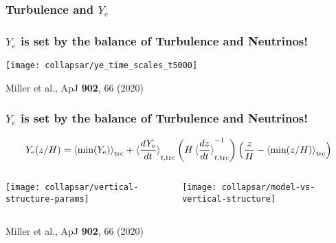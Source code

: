 \documentclass[]{beamer}
\newcommand{\paren}[1]{\left( #1 \right)}
\begin{document}
\begin{frame}
  \frametitle{Turbulence and $Y_e$}
\end{frame}

\begin{frame}
  \frametitle{$Y_e$ is set by the balance of Turbulence and
    Neutrinos!}
  \begin{center}
    \texttt{[image: collapsar/ye\_time\_scales\_t5000]}
  \end{center}
  {\footnotesize Miller et al., ApJ \textbf{902}, 66 (2020)}
\end{frame}

\begin{frame}
  \frametitle{$Y_e$ is set by the balance of Turbulence and
    Neutrinos!}
  \begin{displaymath}
      Y_{\rm e}(z/H) = \braket{\text{min}(Y_{\rm e})}_{\text{trc}}
      + \braket{\frac{d Y_{\rm e}}{dt}}_{t,\text{trc}} \paren{H\braket{\frac{dz}{dt}}_{t,\text{trc}}^{-1}}\paren{\frac{z}{H} - \braket{\text{min}(z/H)}_{\text{trc}}}
    \end{displaymath}
    \begin{columns}
      \begin{column}{6cm}
        \texttt{[image: collapsar/vertical-structure-params]}
      \end{column}
      \begin{column}{6cm}
        \texttt{[image: collapsar/model-vs-vertical-structure]}
      \end{column}
    \end{columns}
    {\footnotesize Miller et al., ApJ \textbf{902}, 66 (2020)}
\end{frame}
\end{document}
